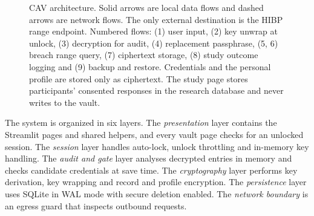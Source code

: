 \documentclass[conference]{IEEEtran}
\begin{document}
\begin{figure}[t]
\caption{CAV architecture. Solid arrows are local data flows and dashed arrows are network flows. The only external destination is the HIBP range endpoint. Numbered flows: (1) user input, (2) key unwrap at unlock, (3) decryption for audit, (4) replacement passphrase, (5, 6) breach range query, (7) ciphertext storage, (8) study outcome logging and (9) backup and restore. Credentials and the personal profile are stored only as ciphertext. The study page stores participants' consented responses in the research database and never writes to the vault.}
\label{fig:arch}
\end{figure}

The system is organized in six layers. The \emph{presentation} layer contains the Streamlit pages and shared helpers, and every vault page checks for an unlocked session. The \emph{session} layer handles auto-lock, unlock throttling and in-memory key handling. The \emph{audit and gate} layer analyses decrypted entries in memory and checks candidate credentials at save time. The \emph{cryptography} layer performs key derivation, key wrapping and record and profile encryption. The \emph{persistence} layer uses SQLite in WAL mode with secure deletion enabled. The \emph{network boundary} is an egress guard that inspects outbound requests.
\end{document}
